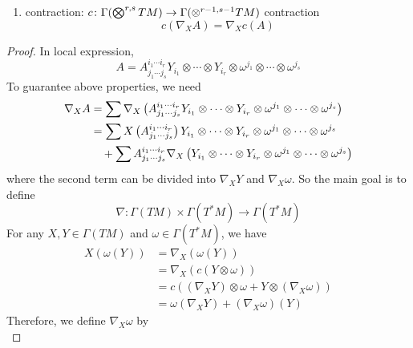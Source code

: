 \begin{enumerate}[label=\arabic{*}.]
\begin{prop}
\begin{enumerate}[label=(\arabic{*})]
			\item contraction: $c \colon \Gamma(\bigotimes^{r,s}TM) \rightarrow \Gamma(\otimes^{r-1,s-1}TM)$ contraction
			\begin{equation*}
				c(\nabla_X A) = \nabla_X c(A)
			\end{equation*}
		\end{enumerate}
	\end{prop}
	\begin{proof}
		In local expression,
		\begin{equation*}
			A = A^{i_1 \cdots i_r}_{j_1 \cdots j_s} Y_{i_1}\otimes \cdots \otimes Y_{i_r} \otimes \omega^{j_1} \otimes \cdots \otimes \omega^{j_s}
		\end{equation*}
		To guarantee above properties, we need 
		\begin{equation*}
			\begin{aligned}
				\nabla_XA &= \sum \nabla_X\left(A^{i_1 \cdots i_r}_{j_1 \cdots j_s} Y_{i_1}\otimes \cdots \otimes Y_{i_r} \otimes \omega^{j_1} \otimes \cdots \otimes \omega^{j_s}\right) \\
				&= \sum X\left(A^{i_1 \cdots i_r}_{j_1 \cdots j_s}\right) Y_{i_1}\otimes \cdots \otimes Y_{i_r} \otimes \omega^{j_1} \otimes \cdots \otimes \omega^{j_s} \\
				&\quad + \sum A^{i_1 \cdots i_r}_{j_1 \cdots j_s} \nabla_X \left(Y_{i_1}\otimes \cdots \otimes Y_{i_r} \otimes \omega^{j_1} \otimes \cdots \otimes \omega^{j_s}\right)
			\end{aligned}
		\end{equation*}
		where the second term can be divided into $\nabla_XY$ and $\nabla_X\omega$. So the main goal is to define
		\begin{equation*}
			\nabla \colon \Gamma(TM) \times \Gamma(T^*M) \longrightarrow \Gamma(T^*M)
		\end{equation*}
		For any $X,Y \in \Gamma(TM)$ and $\omega \in \Gamma(T^*M)$, we have
		\begin{equation*}
			\begin{aligned}
				X(\omega(Y)) &= \nabla_X (\omega(Y)) \\
				&= \nabla_X(c(Y\otimes \omega)) \\
				&= c((\nabla_XY)\otimes \omega + Y \otimes (\nabla_X \omega))\\
				&= \omega(\nabla_XY)+ (\nabla_X\omega)(Y)
			\end{aligned}
		\end{equation*}
		Therefore, we define $\nabla_X\omega$ by
		\begin{equation*}

\end{equation*}
\end{proof}
\end{enumerate}
